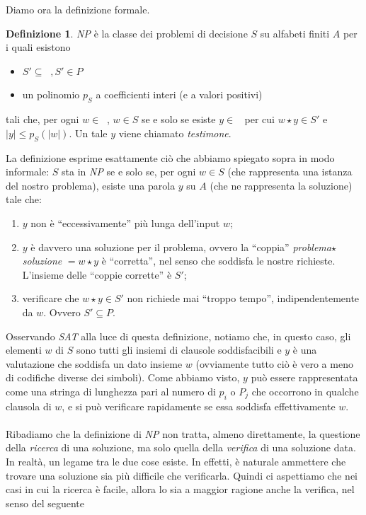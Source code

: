 \documentclass[12pt,a4paper]{report}
\theoremstyle{definition}
\newtheorem{defn}[teo]{Definizione}  %
\DeclareMathOperator{\aaa}{\textit{A}^{\star}}
\begin{document}
Diamo ora la definizione formale.

\begin{defn}\label{def_NP}
\emph{NP} è la classe dei problemi di decisione $S$ su alfabeti finiti $A$ per i quali esistono
\begin{itemize}
\item $S' \subseteq \aaa, S' \in P$
\item un polinomio $p_S$ a coefficienti interi (e a valori positivi)
\end{itemize}
tali che, per ogni $w \in \aaa$, $w \in S$ se e solo se esiste $y \in \aaa$ per cui $w \star y \in S'$ e $|y| \leq p_S(|w|)$. Un tale $y$ viene chiamato \emph{testimone}.
\end{defn}

La definizione esprime esattamente ciò che abbiamo spiegato sopra in modo informale: $S$ sta in \emph{NP} se e solo se, per ogni $w \in S$ (che rappresenta una istanza del nostro problema), esiste una parola $y$ su $A$ (che ne rappresenta la soluzione) tale che:
\begin{enumerate}
\item $y$ non è ``eccessivamente'' più lunga dell'input $w$;
\item $y$ è davvero una soluzione per il problema, ovvero la ``coppia'' \emph{problema}$\star$\emph{soluzione} $=w \star y$ è ``corretta'', nel senso che soddisfa le nostre richieste. L'insieme delle ``coppie corrette'' è $S'$;
\item verificare che $w \star y \in S'$ non richiede mai ``troppo tempo'', indipendentemente da $w$. Ovvero $S' \subseteq P$.
\end{enumerate}
Osservando \emph{SAT} alla luce di questa definizione, notiamo che, in questo caso, gli elementi $w$ di $S$ sono tutti gli insiemi di clausole soddisfacibili e $y$ è una valutazione che soddisfa un dato insieme $w$ (ovviamente tutto ciò è vero a meno di codifiche diverse dei simboli). Come abbiamo visto, $y$ può essere rappresentata come una stringa di lunghezza pari al numero di $p_i$ o $P_j$ che occorrono in qualche clausola di $w$, e si può verificare rapidamente se essa soddisfa effettivamente $w$.\\
\\
Ribadiamo che la definizione di \emph{NP} non tratta, almeno direttamente, la questione della \emph{ricerca} di una soluzione, ma solo quella della \emph{verifica} di una soluzione data.\\
In realtà, un legame tra le due cose esiste. In effetti, è naturale ammettere che trovare una soluzione sia più difficile che verificarla. Quindi ci aspettiamo che nei casi in cui la ricerca è facile, allora lo sia a maggior ragione anche la verifica, nel senso del seguente
\end{document}
